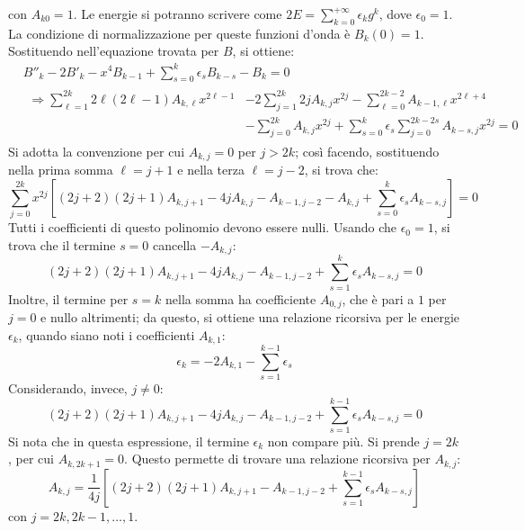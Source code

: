 \documentclass[11pt, a4paper]{scrartcl} %
\numberwithin{equation}{section}
\theoremstyle{style2}
\theoremstyle{style1}
\begin{document}
con $A_{k0}=1 $.
Le energie si potranno scrivere come $2E = \sum_{k=0}^{+\infty} \epsilon _k g^k$, dove $\epsilon _0 = 1$.
La condizione di normalizzazione per queste funzioni d'onda \`e $B_k(0) = 1$. 
Sostituendo nell'equazione trovata per $B$, si ottiene:
\[
	\begin{split}
		&B''_k - 2B'_k - x^4 B_{k-1} + \sum_{s=0}^{k} \epsilon _s B_{k-s} - B_k = 0\\
		&\begin{split}
			\Rightarrow \sum_{\ell =1}^{2k} 2\ell (2\ell -1) A_{k,\ell } x^{2\ell -1} &-2 \sum_{j=1}^{2k} 2j A_{k,j} x^{2j}  - \sum_{\ell =0}^{2k-2} A_{k-1,\ell } x^{2\ell +4} \\
			&- \sum_{j=0}^{2k} A_{k,j} x^{2j}  + \sum_{s=0}^{k} \epsilon _s \sum_{j=0}^{2k-2s} A_{k-s,j} x^{2j} =0
		\end{split}
	\end{split}
\] 
Si adotta la convenzione per cui $A_{k,j} = 0$ per $j > 2k$; cos\`i facendo, sostituendo nella prima somma $\ell = j +1$ e nella terza $\ell = j-2$, si trova che:
\begin{equation*}
	\sum_{j=0}^{2k} x^{2j}\left[ (2j+2)(2j+1) A_{k,j+1} -4j A_{k,j}  - A_{k-1,j-2} -A_{k,j} + \sum_{s=0}^{k} \epsilon _s A_{k-s,j}  \right]  = 0
\end{equation*}
Tutti i coefficienti di questo polinomio devono essere nulli. 
Usando che $\epsilon _0 = 1$, si trova che il termine $s=0$ cancella $-A_{k,j} $:
\begin{equation}
	(2j+2)(2j+1) A_{k,j+1} - 4j A_{k,j} - A_{k-1,j-2} + \sum_{s=1}^{k} \epsilon _s A_{k-s,j} =0
\end{equation}
Inoltre, il termine per $s=k$ nella somma ha coefficiente $A_{0,j} $, che \`e pari a $1$ per $j=0$ e nullo altrimenti; da questo, si ottiene una relazione ricorsiva per le energie $\epsilon _k$, quando siano noti i coefficienti $A_{k,1} $:
\begin{equation}
	\epsilon _k = -2A_{k,1} - \sum_{s=1}^{k-1} \epsilon _s
\end{equation}
Considerando, invece, $j\neq 0 $:
\begin{equation*}
	(2j+2)(2j+1) A_{k,j+1} - 4j A_{k,j} - A_{k-1,j-2} + \sum_{s=1}^{k-1} \epsilon _s A_{k-s,j} =0
\end{equation*}
Si nota che in questa espressione, il termine $\epsilon _k$ non compare pi\`u.
Si prende $j=2k$, per cui $A_{k,2k+1} =0$. 
Questo permette di trovare una relazione ricorsiva per $A_{k,j} $:
\begin{equation}
	A_{k,j} = \frac{1}{4j} \left[ (2j+2)(2j+1)A_{k,j+1} -A_{k-1,j-2} +\sum_{s=1}^{k-1} \epsilon _s A_{k-s,j}  \right] 
\end{equation}
con $j=2k,2k-1, \ldots, 1$.
\end{document}
